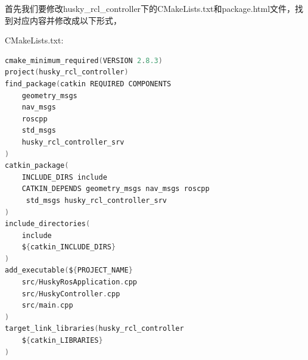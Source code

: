 \documentclass[12pt,UTF8]{ctexart}
\begin{document}
        首先我们要修改husky_rcl_controller下的CMakeLists.txt和package.html文件，找到对应内容并修改成以下形式，
        
        CMakeLists.txt:
\begin{lstlisting}[language=C]
cmake_minimum_required(VERSION 2.8.3)
project(husky_rcl_controller)
find_package(catkin REQUIRED COMPONENTS
    geometry_msgs
    nav_msgs
    roscpp
    std_msgs
    husky_rcl_controller_srv
)
catkin_package(
    INCLUDE_DIRS include
    CATKIN_DEPENDS geometry_msgs nav_msgs roscpp
     std_msgs husky_rcl_controller_srv
)
include_directories(
    include
    ${catkin_INCLUDE_DIRS}
)
add_executable(${PROJECT_NAME}
    src/HuskyRosApplication.cpp
    src/HuskyController.cpp
    src/main.cpp
)
target_link_libraries(husky_rcl_controller
    ${catkin_LIBRARIES}
)
\end{lstlisting}
\end{document}
